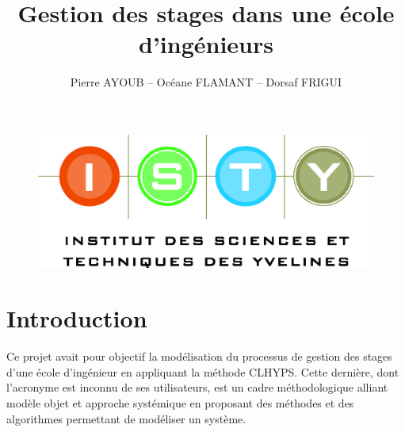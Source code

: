 \documentclass[12pt,a4paper]{article}
\begin{document}
\title{Gestion des stages dans une école d'ingénieurs}
\author{Pierre AYOUB -- Océane FLAMANT -- Dorsaf FRIGUI}

\maketitle

\begin{figure}[b]
    \centering
    \includegraphics[scale=0.3]{pictures/isty.jpg}
\end{figure}

\tableofcontents

\section{Introduction}

Ce projet avait pour objectif la modélisation du processus de gestion des stages
d'une école d'ingénieur en appliquant la méthode CLHYPS. Cette dernière, dont
l'acronyme est inconnu de ses utilisateurs, est un cadre méthodologique alliant
modèle objet et approche systémique en proposant des méthodes et des algorithmes
permettant de modéliser un système.
\end{document}
